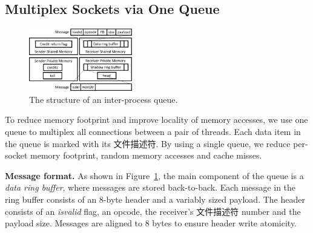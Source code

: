 

\iffalse
\subsection{Multiplex Sockets via One Queue}
\label{socksdirect:subsec:multiplex-conn}

\begin{figure}[t]
	\centering
	\includegraphics[width=0.4\textwidth]{images/locklessq_new}
	
	\caption{The structure of an inter-process queue.}
	
	\label{socksdirect:fig:locklessq-structure}
\end{figure}


To reduce memory footprint and improve locality of memory accesses, we use one queue to multiplex all connections between a pair of threads. Each data item in the queue is marked with its 文件描述符. By using a single queue, we reduce per-socket memory footprint, random memory accesses and cache misses.

\textbf{Message format.}
As shown in Figure~\ref{socksdirect:fig:locklessq-structure}, the main component of the queue is a \emph{data ring buffer}, where messages are stored back-to-back.
Each message in the ring buffer consists of an 8-byte header and a variably sized payload. The header consists of an \textit{isvalid} flag, an opcode, the receiver's 文件描述符 number and the payload size. Messages are aligned to 8 bytes to ensure header write atomicity.%

